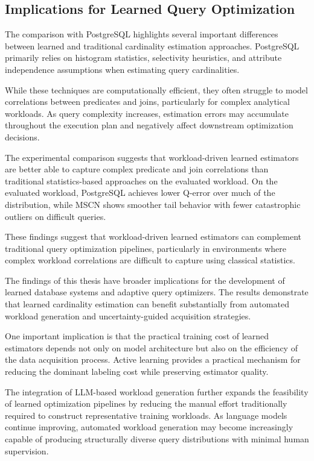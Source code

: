 \subsection{Implications for Learned Query Optimization}

The comparison with PostgreSQL highlights several important differences between learned and traditional cardinality estimation approaches. PostgreSQL primarily relies on histogram statistics, selectivity heuristics, and attribute independence assumptions when estimating query cardinalities.

While these techniques are computationally efficient, they often struggle to model correlations between predicates and joins, particularly for complex analytical workloads. As query complexity increases, estimation errors may accumulate throughout the execution plan and negatively affect downstream optimization decisions.

The experimental comparison suggests that workload-driven learned estimators are better able to capture complex predicate and join correlations than traditional statistics-based approaches on the evaluated workload. On the evaluated workload, PostgreSQL achieves lower Q-error over much of the distribution, while MSCN shows smoother tail behavior with fewer catastrophic outliers on difficult queries.

These findings suggest that workload-driven learned estimators can complement traditional query optimization pipelines, particularly in environments where complex workload correlations are difficult to capture using classical statistics.

The findings of this thesis have broader implications for the development of learned database systems and adaptive query optimizers. The results demonstrate that learned cardinality estimation can benefit substantially from automated workload generation and uncertainty-guided acquisition strategies.

One important implication is that the practical training cost of learned estimators depends not only on model architecture but also on the efficiency of the data acquisition process. Active learning provides a practical mechanism for reducing the dominant labeling cost while preserving estimator quality.

The integration of LLM-based workload generation further expands the feasibility of learned optimization pipelines by reducing the manual effort traditionally required to construct representative training workloads. As language models continue improving, automated workload generation may become increasingly capable of producing structurally diverse query distributions with minimal human supervision.

